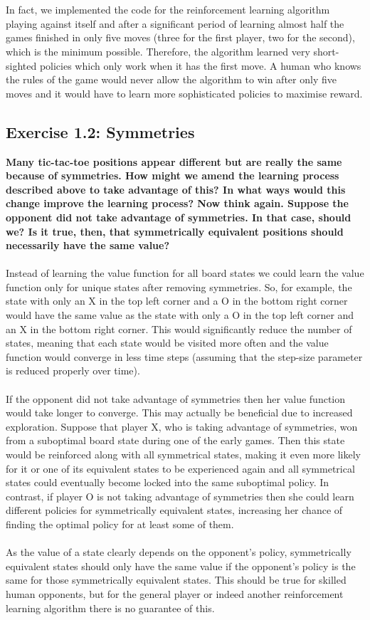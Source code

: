 \documentclass[a4paper,11pt]{article}
\numberwithin{equation}{section}
\theoremstyle{remark}
\begin{document}
\\ \\
In fact, we implemented the code for the reinforcement learning algorithm playing against itself and after a significant period of learning almost half the games finished in only five moves (three for the first player, two for the second), which is the minimum possible. Therefore, the algorithm learned very short-sighted policies which only work when it has the first move. A human who knows the rules of the game would never allow the algorithm to win after only five moves and it would have to learn more sophisticated policies to maximise reward.

\subsection{Exercise 1.2: Symmetries}

\textbf{Many tic-tac-toe positions appear different but are really the same because of symmetries. How might we amend the learning process described above to take advantage of this? In what ways would this change improve the learning process? Now think again. Suppose the opponent did not take advantage of symmetries. In that case, should we? Is it true, then, that symmetrically equivalent positions should necessarily have the same value?}
\\ \\
Instead of learning the value function for all board states we could learn the value function only for unique states after removing symmetries. So, for example, the state with only an X in the top left corner and a O in the bottom right corner would have the same value as the state with only a O in the top left corner and an X in the bottom right corner. This would significantly reduce the number of states, meaning that each state would be visited more often and the value function would converge in less time steps (assuming that the step-size parameter is reduced properly over time).  
\\ \\
If the opponent did not take advantage of symmetries then her value function would take longer to converge. This may actually be beneficial due to increased exploration. Suppose that player X, who is taking advantage of symmetries, won from a suboptimal board state during one of the early games. Then this state would be reinforced along with all symmetrical states, making it even more likely for it or one of its equivalent states to be experienced again and all symmetrical states could eventually become locked into the same suboptimal policy. 
In contrast, if player O is not taking advantage of symmetries then she could learn different policies for symmetrically equivalent states, increasing her chance of finding the optimal policy for at least some of them. 
\\ \\
As the value of a state clearly depends on the opponent's policy, symmetrically equivalent states should only have the same value if the opponent's policy is the same for those symmetrically equivalent states. This should be true for skilled human opponents, but for the general player or indeed another reinforcement learning algorithm there is no guarantee of this.
\end{document}
